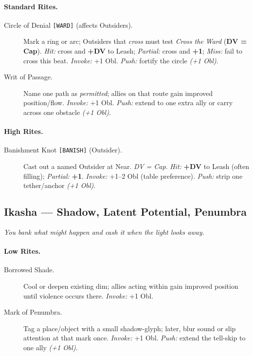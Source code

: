 \documentclass[11pt]{article}
\begin{document}
\paragraph{Standard Rites.}
\begin{description}
  \item[Circle of Denial \texttt{[WARD]} (affects Outsiders).] Mark a ring or arc; Outsiders that \emph{cross} must test \emph{Cross the Ward} (\textbf{DV = Cap}). \emph{Hit:} cross and \textbf{+DV} to Leash; \emph{Partial:} cross and \textbf{+1}; \emph{Miss:} fail to cross this beat. \emph{Invoke:} +1 Obl. \emph{Push:} fortify the circle \emph{(+1 Obl)}.
  \item[Writ of Passage.] Name one path as \emph{permitted}; allies on that route gain improved position/flow. \emph{Invoke:} +1 Obl. \emph{Push:} extend to one extra ally or carry across one obstacle \emph{(+1 Obl)}.
\end{description}

\paragraph{High Rites.}
\begin{description}
  \item[Banishment Knot \texttt{[BANISH]} (Outsider).] Cast out a named Outsider at Near. \emph{DV = Cap}. \emph{Hit:} \textbf{+DV} to Leash (often filling); \emph{Partial:} \textbf{+1}. \emph{Invoke:} +1--2 Obl (table preference). \emph{Push:} strip one tether/anchor \emph{(+1 Obl)}.
\end{description}

\subsection*{Ikasha — Shadow, Latent Potential, Penumbra}
\textit{You bank what might happen and cash it when the light looks away.}

\paragraph{Low Rites.}
\begin{description}
  \item[Borrowed Shade.] Cool or deepen existing dim; allies acting within gain improved position until violence occurs there. \emph{Invoke:} +1 Obl.
  \item[Mark of Penumbra.] Tag a place/object with a small shadow-glyph; later, blur sound or slip attention at that mark once. \emph{Invoke:} +1 Obl. \emph{Push:} extend the tell-skip to one ally \emph{(+1 Obl)}.
\end{description}
\end{document}
